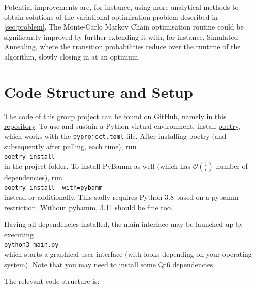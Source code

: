 \documentclass{prettytex/ox/mmsc-special-topic}
\begin{document}
  Potential improvements are, for instance, using more analytical methods to obtain solutions of the variational optimisation problem described in \autoref{sec:problem}.
  The Monte-Carlo Markov Chain optimisation routine could be significantly improved by further extending it with, for instance, Simulated Annealing, where the transition probabilities reduce over the runtime of the algorithm, slowly closing in at an optimum.

  \pagebreak
  \printbibliography

  \pagebreak
  \appendix

  \section{Code Structure and Setup}
  \label{sec:code}
  The code of this group project can be found on GitHub, namely in \href{https://github.com/MrP01/BatteryModelling}{this repository}.
  To use and sustain a Python virtual environment, install
  \href{https://python-poetry.org/}{poetry}, which works with the
  \texttt{pyproject.toml} file. After installing poetry (and subsequently
  after pulling, each time), run \\
  \texttt{poetry install} \\
  in the project folder. To install PyBamm as well (which has $\mathcal{O}(\frac{1}{\epsilon})$ number of dependencies), run \\
  \texttt{poetry install --with=pybamm} \\
  instead or additionally. This sadly requires Python 3.8 based on a
  pybamm restriction. Without pybamm, 3.11 should be fine too.

  Having all dependencies installed, the main interface may be launched up
  by executing \\
  \texttt{python3 main.py} \\
  which starts a graphical user interface (with looks depending on your
  operating system). Note that you may need to install some Qt6 dependencies.

  The relevant code structure is:
\end{document}
